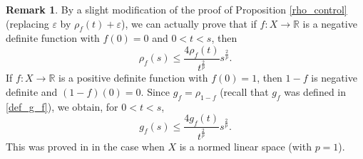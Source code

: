 \documentclass[a4paper,oneside]{amsart}
\theoremstyle{definition}
\newtheorem{rem}[thm]{Remark}
\begin{document}
\begin{rem}\label{amm_ineq}
By a slight modification of the proof of Proposition \ref{rho_control} (replacing $\varepsilon$ by $\rho_f(t)+\varepsilon$), we can actually prove that if $f:X\to{\mathbb{R}}$ is a negative definite function with $f(0)=0$ and $0<t<s$, then 
$$\rho_f(s)\leq\frac{4\rho_f(t)}{t^\frac{2}{p}}s^\frac{2}{p}.$$
If $f:X\to{\mathbb{R}}$ is a positive definite function with $f(0)=1$, then $1-f$ is negative definite and $(1-f)(0)=0$. Since $g_f=\rho_{1-f}$ (recall that $g_f$ was defined in \eqref{def_g_f}), we obtain, for $0<t<s$,
\begin{equation}\label{amm_est}
g_f(s)\leq\frac{4g_f(t)}{t^\frac{2}{p}}s^\frac{2}{p}.
\end{equation}
This was proved in \cite[Corollary~4.9]{amm} in the case when $X$ is a normed linear space (with $p=1$).
\end{rem}
\end{document}

